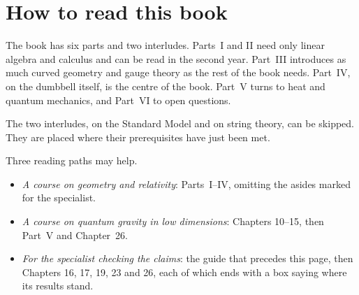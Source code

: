 \chapter*{How to read this book}

The book has six parts and two interludes. Parts~I and II need only linear algebra and calculus and can be read in the second year. Part~III introduces as much curved geometry and gauge theory as the rest of the book needs. Part~IV, on the dumbbell itself, is the centre of the book. Part~V turns to heat and quantum mechanics, and Part~VI to open questions.

The two interludes, on the Standard Model and on string theory, can be skipped. They are placed where their prerequisites have just been met.

Three reading paths may help.
\begin{itemize}[leftmargin=*]
\item \emph{A course on geometry and relativity}: Parts~I--IV, omitting the asides marked for the specialist.
\item \emph{A course on quantum gravity in low dimensions}: Chapters 10--15, then Part~V and Chapter~26.
\item \emph{For the specialist checking the claims}: the guide that precedes this page, then Chapters 16, 17, 19, 23 and 26, each of which ends with a box saying where its results stand.
\end{itemize}
